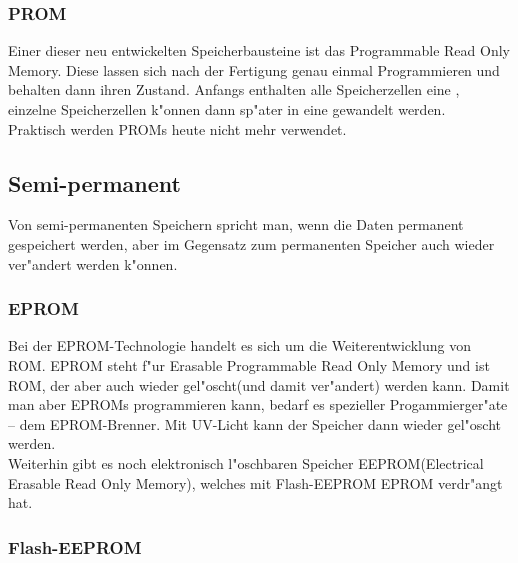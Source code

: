 				\subsubsection{PROM}
				\label{ch:Technisch:sec:Elektronische Speicherung:sub:Fl"uchtig:subsub:PROM}
				
					Einer dieser neu entwickelten Speicherbausteine ist das \glqq Programmable Read Only Memory\grqq{}. Diese lassen sich nach der Fertigung genau einmal Programmieren und behalten dann ihren Zustand. Anfangs enthalten alle Speicherzellen eine \grqq{}, einzelne Speicherzellen k"onnen dann sp"ater in eine \grqq{} gewandelt werden.
					\\
					Praktisch werden PROMs heute nicht mehr verwendet. 
            
        \subsection{Semi-permanent}
        \label{ch:Technisch:sec:Elektronische Speicherung:sub:Semi-permanent}
        
            Von semi-permanenten Speichern spricht man, wenn die Daten permanent gespeichert werden, aber im Gegensatz zum permanenten Speicher auch wieder ver"andert werden k"onnen. 
			
				\subsubsection{EPROM}
				\label{ch:Technisch:sec:Elektronische Speicherung:sub:Fl"uchtig:subsub:EPROM}
					
					Bei der EPROM-Technologie handelt es sich um die Weiterentwicklung von ROM. EPROM steht f"ur \glqq Erasable Programmable Read Only Memory\grqq{} und ist ROM, der aber auch wieder gel"oscht(und damit ver"andert) werden kann. Damit man aber EPROMs programmieren kann, bedarf es spezieller Progammierger"ate – dem \glqq EPROM-Brenner\grqq{}. Mit UV-Licht kann der Speicher dann wieder gel"oscht werden.
					\\
					Weiterhin gibt es noch elektronisch l"oschbaren Speicher EEPROM(\glqq Electrical Erasable Read Only Memory\grqq{}), welches mit Flash-EEPROM EPROM verdr"angt hat.
				
				\subsubsection{Flash-EEPROM}
				\label{ch:Technisch:sec:Elektronische Speicherung:sub:Fl"uchtig:subsub:Flash-EEPROM}
				
